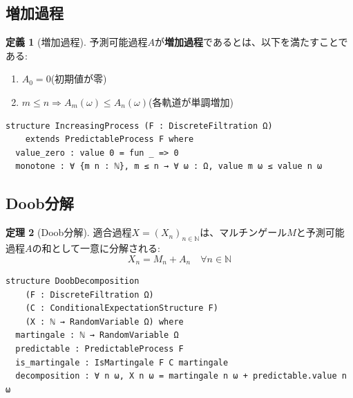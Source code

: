 \documentclass[a4paper,12pt]{ltjsarticle}
\theoremstyle{definition}
\newtheorem{definition}{定義}[section]
\newtheorem{theorem}[definition]{定理}
\begin{document}
\subsection{増加過程}

\begin{definition}[増加過程]
予測可能過程$A$が\textbf{増加過程}であるとは、以下を満たすことである:
\begin{enumerate}
  \item $A_0 = 0$(初期値が零)
  \item $m \leq n \Rightarrow A_m(\omega) \leq A_n(\omega)$(各軌道が単調増加)
\end{enumerate}
\end{definition}

\begin{leanbox}
\begin{verbatim}
structure IncreasingProcess (F : DiscreteFiltration Ω)
    extends PredictableProcess F where
  value_zero : value 0 = fun _ => 0
  monotone : ∀ {m n : ℕ}, m ≤ n → ∀ ω : Ω, value m ω ≤ value n ω
\end{verbatim}
\end{leanbox}

\subsection{Doob分解}

\begin{theorem}[Doob分解]
適合過程$X = (X_n)_{n \in \mathbb{N}}$は、マルチンゲール$M$と予測可能過程$A$の和として一意に分解される:
\[
  X_n = M_n + A_n \quad \forall n \in \mathbb{N}
\]
\end{theorem}

\begin{leanbox}
\begin{verbatim}
structure DoobDecomposition
    (F : DiscreteFiltration Ω)
    (C : ConditionalExpectationStructure F)
    (X : ℕ → RandomVariable Ω) where
  martingale : ℕ → RandomVariable Ω
  predictable : PredictableProcess F
  is_martingale : IsMartingale F C martingale
  decomposition : ∀ n ω, X n ω = martingale n ω + predictable.value n ω
\end{verbatim}
\end{leanbox}

\begin{center}
\end{center}
\end{document}
